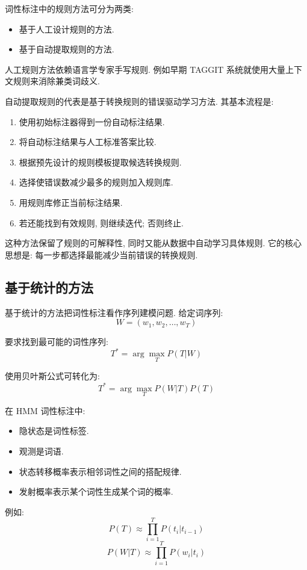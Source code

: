 词性标注中的规则方法可分为两类:

\begin{itemize}
\item 基于人工设计规则的方法.
\item 基于自动提取规则的方法.
\end{itemize}

人工规则方法依赖语言学专家手写规则.
例如早期 TAGGIT 系统就使用大量上下文规则来消除兼类词歧义.

自动提取规则的代表是基于转换规则的错误驱动学习方法.
其基本流程是:

\begin{enumerate}
\item[1.] 使用初始标注器得到一份自动标注结果.
\item[2.] 将自动标注结果与人工标准答案比较.
\item[3.] 根据预先设计的规则模板提取候选转换规则.
\item[4.] 选择使错误数减少最多的规则加入规则库.
\item[5.] 用规则库修正当前标注结果.
\item[6.] 若还能找到有效规则, 则继续迭代; 否则终止.
\end{enumerate}

这种方法保留了规则的可解释性, 同时又能从数据中自动学习具体规则.
它的核心思想是: 每一步都选择最能减少当前错误的转换规则.

\subsection{基于统计的方法}


基于统计的方法把词性标注看作序列建模问题.
给定词序列:
\[
W = (w_1, w_2, \dots, w_T)
\]

要求找到最可能的词性序列:
\[
T^* = \arg\max_{T} P(T | W)
\]

使用贝叶斯公式可转化为:
\[
T^* = \arg\max_{T} P(W | T) P(T)
\]

在 HMM 词性标注中:

\begin{itemize}
\item 隐状态是词性标签.
\item 观测是词语.
\item 状态转移概率表示相邻词性之间的搭配规律.
\item 发射概率表示某个词性生成某个词的概率.
\end{itemize}

例如:
\[
P(T) \approx \prod_{i=1}^T P(t_i | t_{i-1})
\]
\[
P(W | T) \approx \prod_{i=1}^T P(w_i | t_i)
\]

